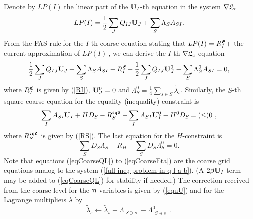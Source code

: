 \documentclass[final]{siamltex}
\begin{document}
Denote by $LP(I)$ the linear part of the ${\bf U}_I$-th equation in
the system $\nabla \mathfrak{L}_c$
\[
LP(I)=\frac{1}{2}\sum_J Q_{IJ}{\bf U}_J + \sum_S \Lambda_S A_{SI}.
\]
From the FAS rule for the $I$-th coarse equation stating that
$LP(I)=R_I^{\mathfrak{E}}+$ the current approximation of $LP(I)~$, we can
derive the $I$-th $\nabla \mathfrak{L}_c$ equation
\begin{equation}\label{eqCoarseQL}
\frac{1}{2}\sum_J Q_{IJ}{\bf U}_J + \sum_S \Lambda_S
A_{SI}-R_I^{\mathfrak{E}}-\frac{1}{2}\sum_J Q_{IJ}{\bf U}_J^0 - \sum_S
\Lambda_S^0 A_{SI}=0,
\end{equation}
where $R_I^{\mathfrak{E}}$ is given by (\ref{RI}), ${\bf U}_J^0=0$ and
$\Lambda_S^0=\frac{1}{4}\sum_{s\in S}\tilde{\lambda}_s$.
Similarly, the $S$-th square coarse equation for the equality
(inequality) constraint is
\begin{equation}\label{eqCoarseEqd}
\sum_IA_{SI}{\bf U}_I+HD_S - R_S^{\mathfrak{eqd}} - \sum_IA_{SI}{\bf U}_I^0-H^0D_S
= (\leq)0~,
\end{equation}
where $R_S^{\mathfrak{eqd}}$ is given by (\ref{RS}).
The last equation for the $H$-constraint is
\begin{equation}\label{eqCoarseEta}
\sum_S D_S\Lambda_S-R_H-\sum_S D_S\Lambda_S^0=0.
\end{equation}
Note that equations (\ref{eqCoarseQL}) to (\ref{eqCoarseEta}) are
the coarse grid equations analog to the system
(\ref{full-ineq-problem-in-q-l-a-b}). (A $2\beta {\bf U}_I$ term may
be added to (\ref{eqCoarseQL}) for stability if needed.) The
correction received from the coarse level for the ${\bf u}$ variables
is given by (\ref{equU}) and for the Lagrange multipliers
$\lambda$ by
\begin{equation}\label{eqLambdaInterpolation}
\tilde{\lambda}_s \leftarrow
\tilde{\lambda}_s+\Lambda_{\substack{S\ni
s}}-\Lambda_{\substack{S\ni s}}^0~.
\end{equation}
\end{document}
